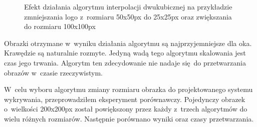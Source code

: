 \begin{figure}[h]
    \centering
    \qquad
    \qquad
    \caption{Efekt działania algorytmu interpolacji dwukubicznej na przykładzie zmniejszania logo \bk z~rozmiaru 50x50px do 25x25px oraz zwiększania do rozmiaru 100x100px}
    \label{fig:bicubic-result}
\end{figure}

Obrazki otrzymane w~wyniku działania algorytmu są najprzyjemniejsze dla oka. Krawędzie są naturalnie rozmyte. Jedyną wadą tego algorytmu skalowania jest czas jego trwania. Algorytm ten zdecydowanie nie nadaje się do przetwarzania obrazów w~czasie rzeczywistym.

W~celu wyboru algorytmu zmiany rozmiaru obrazka do projektowanego systemu wykrywania, przeprowadziłem eksperyment porównawczy. Pojedynczy obrazek o~wielkości 200x200px został powiększony przez każdy z~trzech algorytmów do wielu różnych rozmiarów. Następnie porównano wyniki oraz czasy przetwarzania. 

